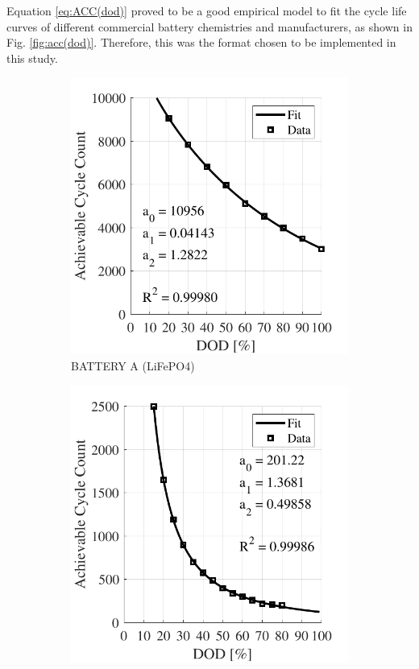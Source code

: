 \documentclass{ieeeaccess}
\begin{document}
    Equation \eqref{eq:ACC(dod)} proved to be a good empirical model to fit the cycle life curves of different commercial battery chemistries and manufacturers, as shown in Fig. \ref{fig:acc(dod)}. Therefore, this was the format chosen to be implemented in this study.
    \begin{figure}[!h]
    	\begin{subfigure}{.235\textwidth}
    		\centering
    		\includegraphics[width=\linewidth]{figures/acc_fitting_NeoVolta_NV24_LiFePO4.pdf}
    		\caption{BATTERY A (LiFePO4)}
    		\label{fig:accNeovolta}
    	\end{subfigure}
    	\begin{subfigure}{.235\textwidth}
    		\centering
    		\includegraphics[width=\linewidth]{figures/acc_fitting_Moura_12MF220_lead-acid.pdf}

\end{subfigure}
\end{figure}
\end{document}
